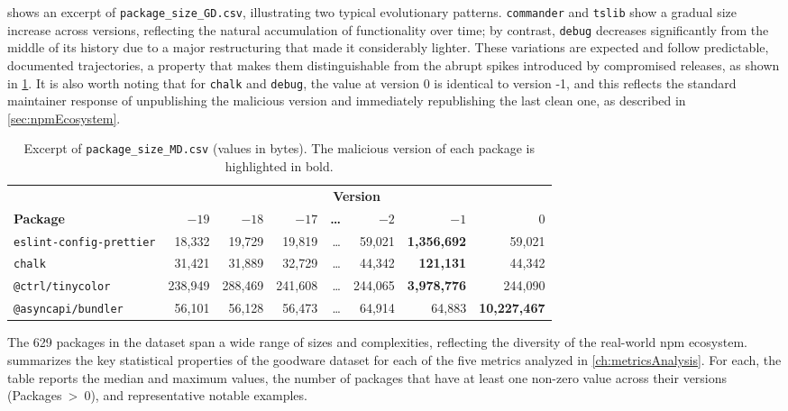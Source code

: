  shows an excerpt of \texttt{package\_size\_GD.csv}, illustrating two typical evolutionary patterns.
\texttt{commander} and \texttt{tslib} show a gradual size increase across versions,
reflecting the natural accumulation of functionality over time;
by contrast, \texttt{debug} decreases significantly from the middle of its history
due to a major restructuring that made it considerably lighter.
These variations are expected and follow predictable, documented trajectories, 
a property that makes them distinguishable from the abrupt spikes introduced by compromised releases, as shown in \cref{tab:csv-malware}.
It is also worth noting that for \texttt{chalk} and \texttt{debug}, the value at version 0 is identical to version -1,
and this reflects the standard maintainer response of unpublishing the malicious version and immediately republishing the last clean one, 
as described in \cref{sec:npmEcosystem}.

\begin{table}[htb]
\centering
\footnotesize
\caption{Excerpt of \texttt{package\_size\_MD.csv} (values in bytes).
The malicious version of each package is highlighted in bold.}
\label{tab:csv-malware}
\begin{tabularx}{\textwidth}{@{} l r r r r r r r @{}}
\toprule
 & \multicolumn{7}{c}{\textbf{Version}} \\ \cmidrule(l){2-8}
\textbf{Package} & \textbf{$-19$} & \textbf{$-18$} & \textbf{$-17$} & \textbf{\ldots} & \textbf{$-2$} & \textbf{$-1$} & \textbf{$0$} \\
\midrule
\texttt{eslint-config-prettier} & 18,332 & 19,729 & 19,819 & \ldots & 59,021 & \textbf{1,356,692} & 59,021 \\
\texttt{chalk}                  & 31,421 & 31,889 & 32,729 & \ldots & 44,342 & \textbf{121,131}   & 44,342 \\
\texttt{@ctrl/tinycolor}        & 238,949 & 288,469 & 241,608 & \ldots & 244,065 & \textbf{3,978,776} & 244,090 \\
\texttt{@asyncapi/bundler}      & 56,101  & 56,128  & 56,473  & \ldots & 64,914  & 64,883 & \textbf{10,227,467} \\
\bottomrule
\end{tabularx}
\end{table}

The 629 packages in the dataset span a wide range of sizes and complexities,
reflecting the diversity of the real-world \ac{npm} ecosystem.
 summarizes the key statistical properties of the goodware dataset for each of the five metrics analyzed in \cref{ch:metricsAnalysis}.
For each, the table reports the median and maximum values, 
the number of packages that have at least one non-zero value across their versions (Packages~>~0), and representative notable examples.

